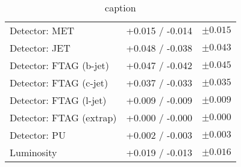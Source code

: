 \begin{table}[h]
\begin{tabular}{lrr}
    Detector: MET            & +0.015 / -0.014 & $ \pm 0.015 $ \\
    Detector: JET            & +0.048 / -0.038 & $ \pm 0.043 $ \\
    Detector: FTAG (b-jet)   & +0.047 / -0.042 & $ \pm 0.045 $ \\
    Detector: FTAG (c-jet)   & +0.037 / -0.033 & $ \pm 0.035 $ \\
    Detector: FTAG (l-jet)   & +0.009 / -0.009 & $ \pm 0.009 $ \\
    Detector: FTAG (extrap)  & +0.000 / -0.000 & $ \pm 0.000 $ \\
    Detector: PU             & +0.002 / -0.003 & $ \pm 0.003 $ \\
    Luminosity               & +0.019 / -0.013 & $ \pm 0.016 $ \\
    \bottomrule
  \end{tabular}
\caption{caption}
\label{tab:breakdown_012L_MVAVH}
\end{table}